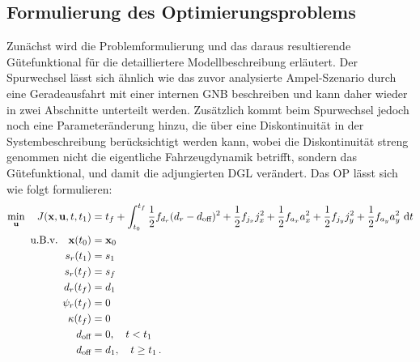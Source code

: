 \subsection{Formulierung des Optimierungsproblems}\label{subsec:Gütefunktional_Spurwechsel}
Zunächst wird die Problemformulierung und das daraus resultierende Gütefunktional für die detailliertere Modellbeschreibung erläutert. Der Spurwechsel lässt sich ähnlich wie das zuvor analysierte Ampel-Szenario durch eine Geradeausfahrt mit einer internen \gls{GNB} beschreiben und kann daher wieder in zwei Abschnitte unterteilt werden. Zusätzlich kommt beim Spurwechsel jedoch noch eine Parameteränderung hinzu, die über eine Diskontinuität in der Systembeschreibung berücksichtigt werden kann, wobei die Diskontinuität streng genommen nicht die eigentliche Fahrzeugdynamik betrifft, sondern das Gütefunktional, und damit die adjungierten \gls{DGL} verändert. Das \gls{OP} lässt sich wie folgt formulieren:
\begin{align}
\min_{\boldsymbol{\mathrm{u}}} \quad J(\boldsymbol{\mathrm{x}},\boldsymbol{\mathrm{u}},t,t_1) &= t_f + \int_{t_0}^{t_f}\frac{1}{2}f_{d_r}(d_r - d_{\textrm{off}})^2 + \frac{1}{2}f_{j_x} j_x^2 + \frac{1}{2}f_{a_x} a_x^2 + \frac{1}{2}f_{j_y} j_y^2 + \frac{1}{2}f_{a_y} a_y^2~\textrm{d}{t} \\
\textrm{u.B.v.} \quad \boldsymbol{\mathrm{x}}(t_0) &= \boldsymbol{\mathrm{x}}_0 \\
s_r(t_1) &= s_1 \\
s_r(t_f) &= s_f \\
d_r(t_f) &= d_1 \label{eq:Spurwechsel_Endbedingung_dr}\\
\psi_r(t_f) &= 0 \label{eq:Spurwechsel_Endbedingung_psir}\\
\kappa(t_f) &= 0 \label{eq:Spurwechsel_Endbedingung_kappa}\\
d_{\textrm{off}} &= 0,\quad t<t_1 \label{eq:Spurwechsel_interneGNB_dr_zero}\\
d_{\textrm{off}} &= d_1,\quad t\geq t_1 \,.\label{eq:Spurwechsel_interneGNB_dr_d1}
\end{align}
